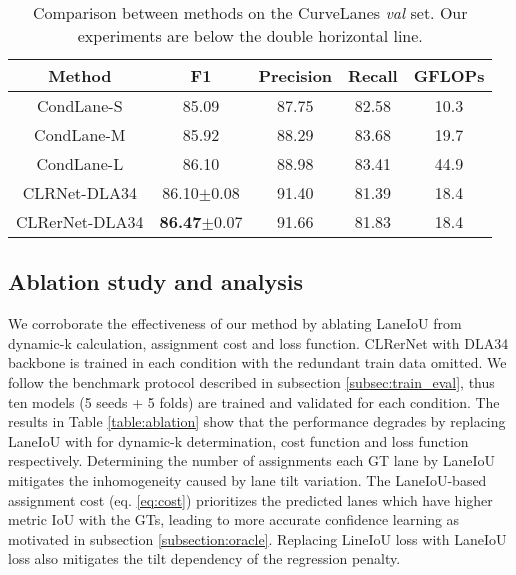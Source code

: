 \documentclass[10pt,twocolumn,letterpaper]{article}
\begin{document}
\begin{table}
\begin{center}
\begin{adjustbox}{width=\linewidth} 
\begin{tabular}{ccccc}
\hline
Method & F1 & Precision & Recall & GFLOPs \\
\hline
CondLane-S\cite{Liu_2021_ICCV}  & 85.09 & 87.75 & 82.58 & 10.3 \\
CondLane-M\cite{Liu_2021_ICCV} & 85.92 & 88.29 & 83.68 & 19.7 \\
CondLane-L\cite{Liu_2021_ICCV} & 86.10 & 88.98 & 83.41  & 44.9 \\
\hline\hline
CLRNet-DLA34\cite{Zheng_2022_CVPR} & 86.10\footnotesize{$\pm$0.08 }& 91.40 & 81.39  & 18.4 \\
CLRerNet-DLA34 & \textbf{86.47}\footnotesize{$\pm$0.07} & 91.66 & 81.83 & 18.4 \\
\hline
\end{tabular}
\end{adjustbox}
\end{center}
\caption{Comparison between methods on the CurveLanes \textit{val} set. Our experiments are below the double horizontal line.}
\label{table:curvelanes}
\end{table}


\subsection{Ablation study and analysis}\label{ablation}
We corroborate the effectiveness of our method by ablating LaneIoU from dynamic-k calculation, assignment cost and loss function.
CLRerNet with DLA34 backbone is trained in each condition with the redundant train data omitted.
We follow the benchmark protocol described in subsection \ref{subsec:train_eval}, thus ten models (5 seeds + 5 folds) are trained and validated for each condition. 
The results in Table \ref{table:ablation} show that the performance degrades by replacing LaneIoU with \cite{Zheng_2022_CVPR} for dynamic-k determination, cost function and loss function respectively.
Determining the number of assignments each GT lane by LaneIoU mitigates the inhomogeneity caused by lane tilt variation.
The LaneIoU-based assignment cost (eq. \ref{eq:cost}) prioritizes the predicted lanes which have higher metric IoU with the GTs, leading to more accurate confidence learning as motivated in subsection \ref{subsection:oracle}.
Replacing LineIoU loss with LaneIoU loss also mitigates the tilt dependency of the regression penalty.
\end{document}
